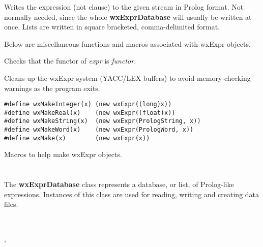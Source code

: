 
Writes the expression (not clause) to the given stream in Prolog
format. Not normally needed, since the whole {\bf wxExprDatabase} will
usually be written at once. Lists are written in square bracketed,
comma-delimited format.


Below are miscellaneous functions and macros associated with wxExpr objects.


Checks that the functor of {\it expr} is {\it functor}.


Cleans up the wxExpr system (YACC/LEX buffers) to avoid memory-checking warnings as the program exits.

\begin{verbatim}
#define wxMakeInteger(x) (new wxExpr((long)x))
#define wxMakeReal(x)    (new wxExpr((float)x))
#define wxMakeString(x)  (new wxExpr(PrologString, x))
#define wxMakeWord(x)    (new wxExpr(PrologWord, x))
#define wxMake(x)        (new wxExpr(x))
\end{verbatim}

Macros to help make wxExpr objects.

\section{}\label{wxexprdatabase}

The {\bf wxExprDatabase} class represents a database, or list,
of Prolog-like expressions.  Instances of this class are used for reading,
writing and creating data files.


\\


, 


\label{wxexprdatabaseconstr}


